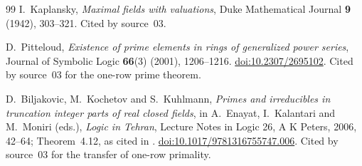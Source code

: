 \documentclass[11pt,letterpaper]{article}
\theoremstyle{definition}
\theoremstyle{remark}
\numberwithin{equation}{section}
\begin{document}
\begin{thebibliography}{99}
I.~Kaplansky, \emph{Maximal fields with valuations},
Duke Mathematical Journal \textbf{9} (1942), 303--321. Cited by source~03.

D.~Pitteloud, \emph{Existence of prime elements in rings of generalized
power series}, Journal of Symbolic Logic \textbf{66}(3) (2001), 1206--1216.
\href{https://doi.org/10.2307/2695102}{doi:10.2307/2695102}.
Cited by source~03 for the one-row prime theorem.

D.~Biljakovic, M.~Kochetov and S.~Kuhlmann, \emph{Primes and irreducibles
in truncation integer parts of real closed fields}, in A.~Enayat,
I.~Kalantari and M.~Moniri (eds.), \emph{Logic in Tehran}, Lecture Notes in
Logic 26, A K Peters, 2006, 42--64; Theorem~4.12, as cited in
\cite[\S1.3]{LM}.
\href{https://doi.org/10.1017/9781316755747.006}{doi:10.1017/9781316755747.006}.
Cited by source~03 for the transfer of one-row primality.

\end{thebibliography}
\end{document}
